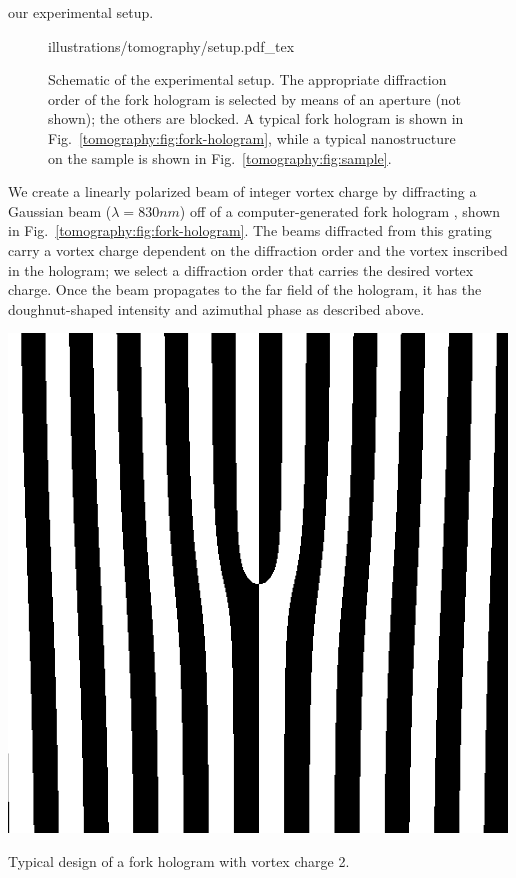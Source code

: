  our experimental setup.
%
\begin{figure}[tb]
\centering
{illustrations/tomography/setup.pdf_tex}
\caption{Schematic of the experimental setup. The appropriate diffraction order of the fork hologram is selected by means of an aperture (not shown); the others are blocked.
A typical fork hologram is shown in Fig.~\ref{tomography:fig:fork-hologram}, while a typical nanostructure on the sample is shown in Fig.~\ref{tomography:fig:sample}.}
\label{fig1}
\end{figure}
%
We create a linearly polarized beam of integer vortex charge by diffracting a Gaussian beam ($\lambda = 830\unit{nm}$) off of a computer-generated fork hologram \cite{Bazhenov1990}, shown in Fig.~\ref{tomography:fig:fork-hologram}.
The beams diffracted from this grating carry a vortex charge dependent on the diffraction order and the vortex inscribed in the hologram; we select a diffraction order that carries the desired vortex charge. Once the beam propagates to the far field of the hologram, it has the doughnut-shaped intensity and azimuthal phase as described above.
%
\begin{marginfigure}
\forcerectofloat\raggedright
\includegraphics[width=0.75\marginparwidth]{illustrations/tomography/fork-hologram}
\caption{Typical design of a fork hologram with vortex charge 2.}
\label{tomography:fig:fork-hologram}
\end{marginfigure}

